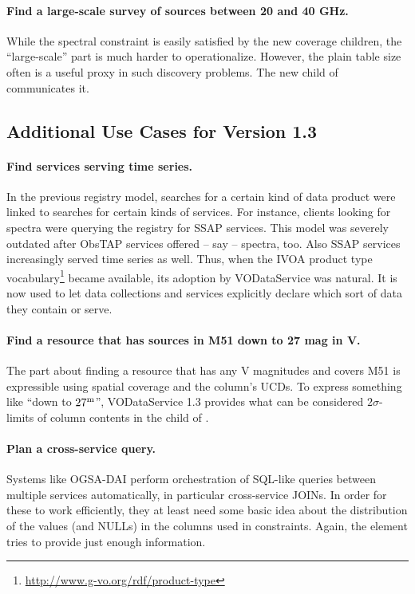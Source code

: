 \documentclass[11pt,a4paper]{ivoa}
\begin{document}
\paragraph{Find a large-scale survey of sources between 20 and 40 GHz.}
While the spectral constraint is easily satisfied by the new coverage
children, the ``large-scale'' part is much harder to operationalize.
However, the plain table size often is a useful proxy in such discovery
problems.  The new  child of  communicates
it.

\subsection{Additional Use Cases for Version 1.3}

\paragraph{Find services serving time series.} In the previous registry
model, searches for a certain kind of data product were linked to
searches for certain kinds of services.  For instance, clients looking
for spectra were querying the registry for SSAP services.  This model
was severely outdated after ObsTAP services offered -- say -- spectra,
too.  Also SSAP services increasingly served time series as well.  Thus,
when the IVOA product type
vocabulary\footnote{\url{http://www.g-vo.org/rdf/product-type}} became
available, its adoption by VODataService was natural.  It is now used
to let data collections and services explicitly declare which sort of
data they contain or serve.

\paragraph{Find a resource that has sources in M51 down to 27 mag in V.}
The part about finding a resource that has any V magnitudes and covers M51 is
expressible using spatial coverage and the column's UCDs.  To express
something like ``down to $27^{\rm m}$'', VODataService 1.3 provides
what can be considered $2\sigma$-limits of column contents in the
 child of .

\paragraph{Plan a cross-service query.} Systems like OGSA-DAI
\citep{2011ASPC..442..579H} perform orchestration of SQL-like queries
between multiple services automatically, in particular cross-service
JOINs.  In order for these to work efficiently, they at least need some
basic idea about the distribution of the values (and NULLs) in the
columns used in constraints.  Again, the  element tries to
provide just enough information.
\end{document}
